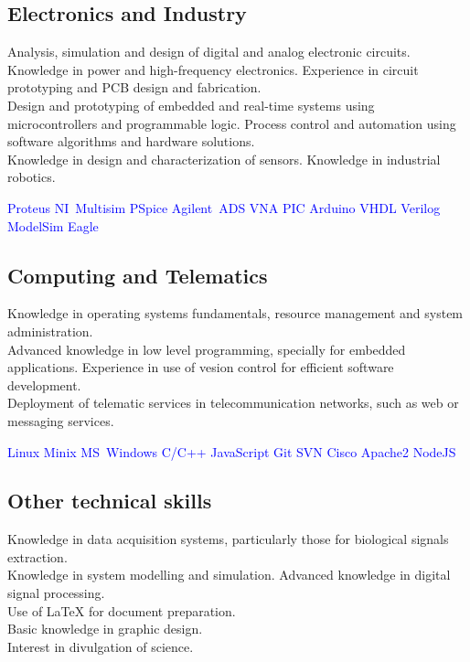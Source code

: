 \documentclass[11pt,a4paper,sans,spanish]{moderncv}
\begin{document}
\subsection{Electronics and Industry}
Analysis, simulation and design of digital and analog electronic circuits. Knowledge in power and high-frequency electronics. Experience in circuit prototyping and PCB design and fabrication.
\protect\\[0.4em]
Design and prototyping of embedded and real-time systems using microcontrollers and programmable logic.
Process control and automation using software algorithms and hardware solutions.
\protect\\[0.4em]
Knowledge in design and characterization of sensors. Knowledge in industrial robotics.

\begin{center}
\textcolor{blue}{
Proteus \quad{} NI~Multisim \quad{} PSpice \quad{} Agilent~ADS \quad{} VNA \quad{} PIC \quad{} Arduino \quad{} VHDL \quad{} Verilog \quad{} ModelSim \quad{} Eagle
}
\end{center}

\subsection{Computing and Telematics}
Knowledge in operating systems fundamentals, resource management and system administration.
\protect\\[0.4em]
Advanced knowledge in low level programming, specially for embedded applications.
Experience in use of vesion control for efficient software development.
\protect\\[0.4em]
Deployment of telematic services in telecommunication networks, such as web or messaging services.

\begin{center}
\textcolor{blue}{
Linux \quad{} Minix \quad{} MS~Windows \quad{} C/C++ \quad{} JavaScript \quad{} Git \quad{} SVN \quad{} Cisco \quad{} Apache2 \quad{} NodeJS
}
\end{center}

\subsection{Other technical skills}
Knowledge in data acquisition systems, particularly those for biological signals extraction.
\protect\\[0.4em]
Knowledge in system modelling and simulation.
Advanced knowledge in digital signal processing.
\protect\\[0.4em]
Use of LaTeX for document preparation.
\protect\\[0.4em]
Basic knowledge in graphic design.
\protect\\[0.4em]
Interest in divulgation of science.
\end{document}
